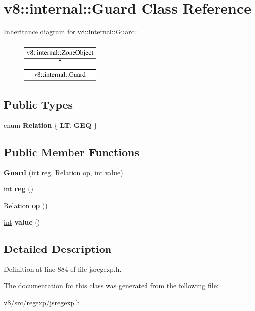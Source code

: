 \hypertarget{classv8_1_1internal_1_1Guard}{}\section{v8\+:\+:internal\+:\+:Guard Class Reference}
\label{classv8_1_1internal_1_1Guard}
Inheritance diagram for v8\+:\+:internal\+:\+:Guard\+:\begin{figure}[H]
\begin{center}
\leavevmode
\includegraphics[height=2.000000cm]{classv8_1_1internal_1_1Guard}
\end{center}
\end{figure}
\subsection*{Public Types}
\begin{DoxyCompactItemize}
\item 
\mbox{\label{classv8_1_1internal_1_1Guard_a44b79b60fa04620a19805724d7372284}} 
enum {\bfseries Relation} \{ {\bfseries LT}, 
{\bfseries G\+EQ}
 \}
\end{DoxyCompactItemize}
\subsection*{Public Member Functions}
\begin{DoxyCompactItemize}
\item 
\mbox{\label{classv8_1_1internal_1_1Guard_a1852d4717d48fa87b5cc7cac576dd56d}} 
{\bfseries Guard} (\mbox{\hyperlink{classint}{int}} reg, Relation op, \mbox{\hyperlink{classint}{int}} value)
\item 
\mbox{\label{classv8_1_1internal_1_1Guard_adc12b180ae664af6f07fdc95c9f7c4a3}} 
\mbox{\hyperlink{classint}{int}} {\bfseries reg} ()
\item 
\mbox{\label{classv8_1_1internal_1_1Guard_a5333a5b7ae284bfecb111dd6b1e59463}} 
Relation {\bfseries op} ()
\item 
\mbox{\label{classv8_1_1internal_1_1Guard_aaa76818527880f43a2bb9b7e9aa03fe1}} 
\mbox{\hyperlink{classint}{int}} {\bfseries value} ()
\end{DoxyCompactItemize}


\subsection{Detailed Description}


Definition at line 884 of file jsregexp.\+h.



The documentation for this class was generated from the following file\+:\begin{DoxyCompactItemize}
\item 
v8/src/regexp/jsregexp.\+h\end{DoxyCompactItemize}

